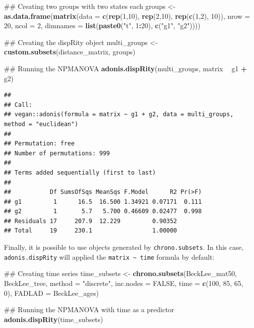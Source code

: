 \documentclass[]{book}
\newenvironment{Shaded}{\begin{snugshade}}{\end{snugshade}}
\newcommand{\KeywordTok}[1]{\textcolor[rgb]{0.13,0.29,0.53}{\textbf{#1}}}
\newcommand{\DataTypeTok}[1]{\textcolor[rgb]{0.13,0.29,0.53}{#1}}
\newcommand{\DecValTok}[1]{\textcolor[rgb]{0.00,0.00,0.81}{#1}}
\newcommand{\StringTok}[1]{\textcolor[rgb]{0.31,0.60,0.02}{#1}}
\newcommand{\OtherTok}[1]{\textcolor[rgb]{0.56,0.35,0.01}{#1}}
\newcommand{\OperatorTok}[1]{\textcolor[rgb]{0.81,0.36,0.00}{\textbf{#1}}}
\newcommand{\NormalTok}[1]{#1}
\theoremstyle{definition}
\theoremstyle{definition}
\theoremstyle{definition}
\theoremstyle{remark}
\begin{document}
\begin{Shaded}
\begin{Highlighting}[]
\NormalTok{## Creating two groups with two states each}
\NormalTok{groups <-}\StringTok{ }\KeywordTok{as.data.frame}\NormalTok{(}\KeywordTok{matrix}\NormalTok{(}\DataTypeTok{data =} \KeywordTok{c}\NormalTok{(}\KeywordTok{rep}\NormalTok{(}\DecValTok{1}\NormalTok{,}\DecValTok{10}\NormalTok{), }\KeywordTok{rep}\NormalTok{(}\DecValTok{2}\NormalTok{,}\DecValTok{10}\NormalTok{), }\KeywordTok{rep}\NormalTok{(}\KeywordTok{c}\NormalTok{(}\DecValTok{1}\NormalTok{,}\DecValTok{2}\NormalTok{), }\DecValTok{10}\NormalTok{)),}
         \DataTypeTok{nrow =} \DecValTok{20}\NormalTok{, }\DataTypeTok{ncol =} \DecValTok{2}\NormalTok{, }\DataTypeTok{dimnames =} \KeywordTok{list}\NormalTok{(}\KeywordTok{paste0}\NormalTok{(}\StringTok{"t"}\NormalTok{, }\DecValTok{1}\OperatorTok{:}\DecValTok{20}\NormalTok{), }\KeywordTok{c}\NormalTok{(}\StringTok{"g1"}\NormalTok{, }\StringTok{"g2"}\NormalTok{))))}

\NormalTok{## Creating the dispRity object}
\NormalTok{multi_groups <-}\StringTok{ }\KeywordTok{custom.subsets}\NormalTok{(distance_matrix, groups)}

\NormalTok{## Running the NPMANOVA}
\KeywordTok{adonis.dispRity}\NormalTok{(multi_groups, matrix }\OperatorTok{~}\StringTok{ }\NormalTok{g1 }\OperatorTok{+}\StringTok{ }\NormalTok{g2)}
\end{Highlighting}
\end{Shaded}

\begin{verbatim}
## 
## Call:
## vegan::adonis(formula = matrix ~ g1 + g2, data = multi_groups,      method = "euclidean") 
## 
## Permutation: free
## Number of permutations: 999
## 
## Terms added sequentially (first to last)
## 
##           Df SumsOfSqs MeanSqs F.Model      R2 Pr(>F)
## g1         1      16.5  16.500 1.34921 0.07171  0.111
## g2         1       5.7   5.700 0.46609 0.02477  0.998
## Residuals 17     207.9  12.229         0.90352       
## Total     19     230.1                 1.00000
\end{verbatim}

Finally, it is possible to use objects generated by
\texttt{chrono.subsets}. In this case, \texttt{adonis.dispRity} will
applied the \texttt{matrix\ \textasciitilde{}\ time} formula by default:

\begin{Shaded}
\begin{Highlighting}[]
\NormalTok{## Creating time series}
\NormalTok{time_subsets <-}\StringTok{ }\KeywordTok{chrono.subsets}\NormalTok{(BeckLee_mat50, BeckLee_tree, }
     \DataTypeTok{method =} \StringTok{"discrete"}\NormalTok{, }\DataTypeTok{inc.nodes =} \OtherTok{FALSE}\NormalTok{, }\DataTypeTok{time =} \KeywordTok{c}\NormalTok{(}\DecValTok{100}\NormalTok{, }\DecValTok{85}\NormalTok{, }\DecValTok{65}\NormalTok{, }\DecValTok{0}\NormalTok{),}
     \DataTypeTok{FADLAD =}\NormalTok{ BeckLee_ages)}

\NormalTok{## Running the NPMANOVA with time as a predictor}
\KeywordTok{adonis.dispRity}\NormalTok{(time_subsets)}
\end{Highlighting}
\end{Shaded}
\end{document}
